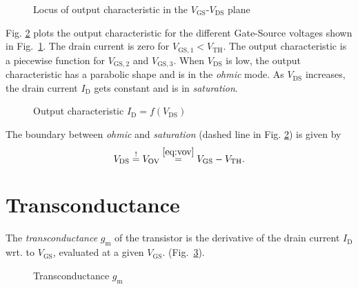 \documentclass{article}[11pt]
\begin{document}
\begin{figure}[H]
  \centering
  \begin{tikzpicture}[scale=1.2]
    
  \end{tikzpicture}
  \caption{Locus of output characteristic in the $V_{\mathrm{GS}}$-$V_{\mathrm{DS}}$ plane}
  \label{fig:squarelawregionplotout}
\end{figure}

Fig. \ref{fig:squarelawout} plots the output characteristic for the different
Gate-Source voltages shown in Fig.~\ref{fig:squarelawregionplotout}.
The drain current is zero for $V_{\mathrm{GS,1}}<V_{\mathrm{TH}}$.
The output characteristic is a piecewise function for $V_{\mathrm{GS,2}}$
and $V_{\mathrm{GS,3}}$.
When $V_{\mathrm{DS}}$ is low, the output characteristic has a 
parabolic shape and is in the \textit{ohmic} mode.
As $V_{\mathrm{DS}}$ increases, the drain current $I_{\mathrm{D}}$
gets constant and is in \textit{saturation}.

\begin{figure}[H]
  \centering
  \begin{tikzpicture}[scale=1.2]
    
  \end{tikzpicture}
  \caption{Output characteristic $I_{\mathrm{D}} = f(V_{\mathrm{DS}})$}
  \label{fig:squarelawout}
\end{figure}

The boundary between \textit{ohmic} and \textit{saturation} 
(dashed line in Fig. \ref{fig:squarelawout}) is given by 
\begin{equation}
  V_{\mathrm{DS}} \stackrel{!}{=} V_{\mathrm{OV}} 
                  \stackrel{\eqref{eq:vov}}{=} V_{\mathrm{GS}} - V_{\mathrm{TH}}.
\end{equation}

\section{Transconductance}\label{sec:gm}

The \textit{transconductance} $g_{\mathrm{m}}$ of the transistor is the 
derivative of the drain current $I_{\mathrm{D}}$ wrt. to 
$V_{\mathrm{GS}}$, evaluated at a given $V_{\mathrm{GS}}$.
(Fig.~\ref{fig:squarelaw-gm}).

\begin{figure}[H]
  \centering
  \begin{tikzpicture}[scale=1.2]
    
  \end{tikzpicture} 
  \caption{Transconductance $g_{\mathrm{m}}$}
  \label{fig:squarelaw-gm}
\end{figure}
\end{document}
